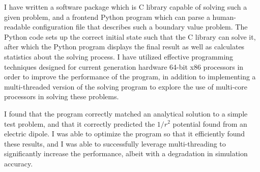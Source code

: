 \documentclass[12pt]{article}
\begin{document}
I have written a software package which is C library capable of solving such a given problem, and a frontend
Python program which can parse a human-readable configuration file that describes such a boundary value problem. 
The Python code sets up the correct initial state such that the C library can solve it, after which the Python program
displays the final result as well as calculates statistics about the solving process. I have utilized effective
programming techniques designed for current generation hardware 64-bit x86 processors in order to improve
the performance of the program, in addition to implementing a multi-threaded version of the solving program
to explore the use of multi-core processors in solving these problems.

I found that the program correctly matched an analytical solution to a simple test problem, and that it correctly
predicted the $1/r^2$ potential found from an electric dipole. I was able to optimize the program so that it
efficiently found these results, and I was able to successfully leverage multi-threading to significantly increase
the performance, albeit with a degradation in simulation accuracy.

\clearpage
\doublespacing







\end{document}
